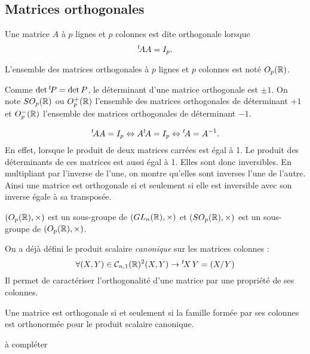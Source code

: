 \newpage
\subsection{Matrices orthogonales}
\begin{defi}
 Une matrice $A$ à $p$ lignes et $p$ colonnes est dite orthogonale lorsque
\begin{displaymath}
 \mathstrut^t\! A A = I_p .
\end{displaymath}
\end{defi}
\begin{nota}
 L'ensemble des matrices orthogonales à $p$ lignes et $p$ colonnes est noté $O_p(\mathbb{R})$.
\end{nota}
\begin{rem}
 Comme $\det \mathstrut^t\! P = \det P$, le déterminant d'une matrice orthogonale est $\pm 1$. On note $SO_p(\mathbb{R})$ ou $O_{p}^+(\mathbb{R})$ l'ensemble des matrices orthogonales de déterminant $+1$ et $O_{p}^{-}(\mathbb{R})$ l'ensemble des matrices orthogonales de déterminant $-1$.
\end{rem}

\begin{rem}
\begin{displaymath}
  \mathstrut^t\! A A=I_p \Leftrightarrow A \mathstrut^t\! A = I_p \Leftrightarrow \mathstrut^t\! A = A^{-1}.
\end{displaymath}
En effet, lorsque le produit de deux matrices carrées est égal à 1. Le produit des déterminants de ces matrices est aussi égal à 1. Elles sont donc inversibles. En multipliant par l'inverse de l'une, on montre qu'elles sont inverses l'une de l'autre. Ainsi une matrice est orthogonale si et seulement si elle est inversible avec son inverse égale à sa transposée.
\end{rem}

\begin{propn}
 $(O_p(\mathbb{R}),\times)$ est un sous-groupe de $(GL_n(\mathbb{R}),\times)$ et $(SO_p(\mathbb{R}),\times)$ est un sous-groupe de $(O_p(\mathbb{R}),\times)$.
\end{propn}
On a déjà défini le produit scalaire \emph{canonique} sur les matrices colonnes :
\begin{displaymath}
\forall (X,Y) \in \mathcal C_{n,1}(\mathbb{R})^2  (X,Y) \rightarrow \mathstrut^t\! X\,Y =(X/Y)
\end{displaymath}
Il permet de caractériser l'orthogonalité d'une matrice par une propriété de ses colonnes.
\begin{propn}
 Une matrice est orthogonale si et seulement si la famille formée par ses colonnes est orthonormée pour le produit scalaire canonique.
\end{propn}
\begin{demo}
 à compléter
\end{demo}

